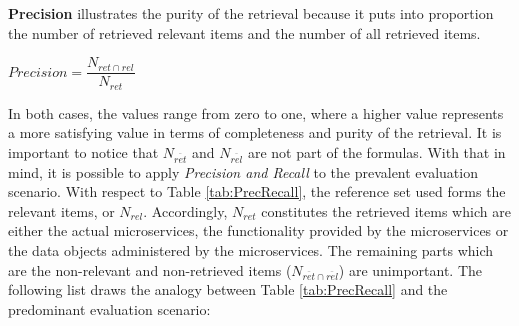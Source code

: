 \noindent
\textbf{Precision} illustrates the purity of the retrieval because it puts into proportion the number of retrieved relevant items and the number of all retrieved items.

\begin{centering}
	\vspace{1cm}
	
	$Precision=\dfrac{N_{ret\cap rel}}{ N_{ret} }  $
	
	\vspace{1cm}
\end{centering} 

 
\noindent
In both cases, the values range from zero to one, where a higher value represents a more satisfying value in terms of completeness and purity of the retrieval.
It is important to notice that $N_{\overline{ret}}$ and $N_{\overline{rel}}$ are not part of the formulas. With that in mind, it is possible to apply \textit{Precision and Recall} to the prevalent evaluation scenario. With respect to Table \ref{tab:PrecRecall}, the reference set used forms the relevant items, or $N_{rel}$. Accordingly, $N_{ret}$ constitutes the retrieved items which are either the actual microservices, the functionality provided by the microservices or the data objects administered by the microservices.
The remaining parts which are the non-relevant and non-retrieved items ($N_{\overline{ret}\cap \overline{rel}}$) are unimportant. The following list draws the analogy between Table \ref{tab:PrecRecall} and the predominant evaluation scenario:
